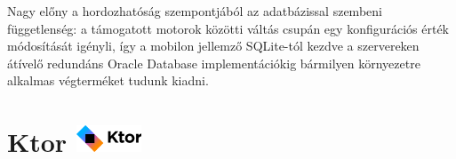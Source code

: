 Nagy előny a hordozhatóság szempontjából az adatbázissal szembeni függetlenség: a támogatott motorok közötti váltás csupán egy konfigurációs érték módosítását igényli, így a mobilon jellemző SQLite-tól kezdve a szervereken átívelő redundáns Oracle Database implementációkig bármilyen környezetre alkalmas végterméket tudunk kiadni.

\section{Ktor {\hspace{1cm}\includegraphics[height=8mm, keepaspectratio]{images/ktor_logo.png}}}